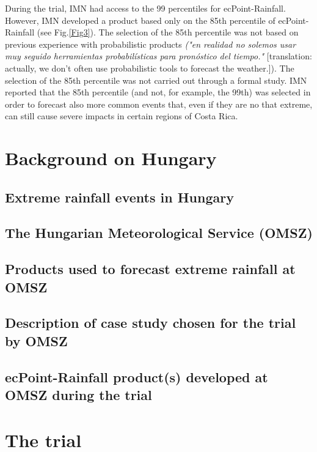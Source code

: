 \documentclass[twocol]{ametsocV5} %
\begin{document}
During the trial, IMN had access to the 99 percentiles for ecPoint-Rainfall. However, IMN developed a product based only on the 85th percentile of ecPoint-Rainfall (see Fig.\ref{Fig3}). The selection of the 85th percentile was not based on previous experience with probabilistic products \textit{("en realidad no solemos usar muy seguido herramientas probabilísticas para pronóstico del tiempo."} [translation: actually, we don't often use probabilistic tools to forecast the weather.]). The selection of the 85th percentile was not carried out through a formal study. IMN reported that the 85th percentile (and not, for example, the 99th) was selected in order to forecast also more common events that, even if they are no that extreme, can still cause severe impacts in certain regions of Costa Rica.



\section{Background on Hungary}

\subsection{Extreme rainfall events in Hungary}

\subsection{The Hungarian Meteorological Service (OMSZ)}


\subsection{Products used to forecast extreme rainfall at OMSZ}

\subsection{Description of case study chosen for the trial by OMSZ}

\subsection{ecPoint-Rainfall product(s) developed at OMSZ during the trial}



\section{The trial} 
\end{document}
